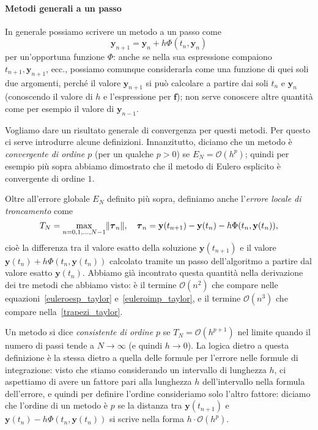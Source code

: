\documentclass[a4paper]{report}
\DeclarePairedDelimiter{\norm}{\lVert}{\rVert}
\theoremstyle{definiton}
\theoremstyle{remark}
\newcommand{\y}{\mathbf{y}}
\newcommand{\f}{\mathbf{f}}
\begin{document}
\paragraph{Metodi generali a un passo}

In generale possiamo scrivere un metodo a un passo come
\begin{equation} \label{metodoaunpasso}
    \y_{n+1} = \y_n + h\Phi(t_n,\y_n)    
\end{equation}
per un'opportuna funzione $\Phi$: anche se nella sua espressione compaiono $t_{n+1},\y_{n+1}$, ecc., possiamo comunque considerarla come una funzione di quei soli due argomenti, perché il valore $\y_{n+1}$ si può calcolare a partire dai soli $t_n$ e $\y_n$ (conoscendo il valore di $h$ e l'espressione per $\f$); non serve conoscere altre quantità come per esempio il valore di $\y_{n-1}$.

Vogliamo dare un risultato generale di convergenza per questi metodi. Per questo ci serve introdurre alcune definizioni. Innanzitutto, diciamo che un metodo è \emph{convergente di ordine $p$} (per un qualche $p>0$) se $E_N = \mathcal{O}(h^p)$; quindi per esempio più sopra abbiamo dimostrato che il metodo di Eulero esplicito è convergente di ordine $1$.

Oltre all'errore globale $E_N$ definito più sopra, definiamo anche l'\emph{errore locale di troncamento} come
\[
T_N = \max_{n=0,1,\dots,N-1} \norm{\boldsymbol{\tau}_n}, \quad \boldsymbol{\tau}_n = \y(t_{n+1}) - \y(t_n) - h\Phi(t_n, \y(t_n)) ,
\]
cioè la differenza tra il valore esatto della soluzione $\y(t_{n+1})$ e il valore $\y(t_n) + h\Phi(t_n, \y(t_n))$ calcolato tramite un passo dell'algoritmo a partire dal valore esatto $\y(t_n)$. Abbiamo già incontrato questa quantità nella derivazione dei tre metodi che abbiamo visto: è il termine $\mathcal{O}(n^2)$ che compare nelle equazioni~\eqref{euleroesp_taylor} e~\eqref{euleroimp_taylor}, e il termine $\mathcal{O}(n^3)$ che compare nella~\eqref{trapezi_taylor}.

Un metodo si dice \emph{consistente di ordine $p$} se $T_N = \mathcal{O}(h^{p+1})$ nel limite quando il numero di passi tende a $N\to \infty$ (e quindi $h \to 0$). La logica dietro a questa definizione è la stessa dietro a quella delle formule per l'errore nelle formule di integrazione: visto che stiamo considerando un intervallo di lunghezza $h$, ci aspettiamo di avere un fattore pari alla lunghezza $h$ dell'intervallo nella formula dell'errore, e quindi per definire l'ordine consideriamo solo l'altro fattore: diciamo che l'ordine di un metodo è $p$ se la distanza tra $\y(t_{n+1})$ e $\y(t_n) - h\Phi(t_n, \y(t_n))$ si scrive nella forma $h \cdot \mathcal{O}(h^p)$.
\end{document}
